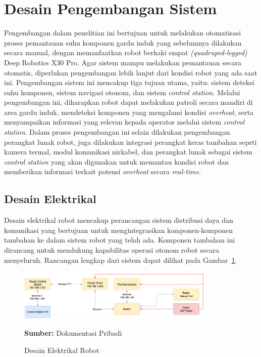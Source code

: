 \section{Desain Pengembangan Sistem}
Pengembangan dalam penelitian ini bertujuan untuk melakukan otomatisasi proses pemantauan suhu komponen gardu induk yang sebelumnya dilakukan secara manual, dengan memanfaatkan robot berkaki empat \emph{(quadruped-legged)} Deep Robotics X30 Pro. Agar sistem mampu melakukan pemantauan secara otomatis, diperlukan pengembangan lebih lanjut dari kondisi robot yang ada saat ini. Pengembangan sistem ini mencakup tiga tujuan utama, yaitu: sistem deteksi suhu komponen, sistem navigasi otonom, dan sistem \emph{control station}. Melalui pengembangan ini, diharapkan robot dapat melakukan patroli secara mandiri di area gardu induk, mendeteksi komponen yang mengalami kondisi \emph{overheat}, serta menyampaikan informasi yang relevan kepada operator melalui sistem \emph{control station}. Dalam proses pengembangan ini selain dilakukan pengembangan perangkat lunak robot, juga dilakukan integrasi perangkat keras tambahan seprti kamera termal, modul komunikasi nirkabel, dan perangkat lunak sebagai sistem \emph{control station} yang akan digunakan untuk memantau kondisi robot dan memberikan informasi terkait potensi \emph{overheat} secara \emph{real-time}.

\subsection{Desain Elektrikal}

Desain elektrikal robot mencakup perancangan sistem distribusi daya dan komunikasi yang bertujuan untuk mengintegrasikan komponen-komponen tambahan ke dalam sistem robot yang telah ada. Komponen tambahan ini dirancang untuk mendukung kapabilitas operasi otonom robot secara menyeluruh. Rancangan lengkap dari sistem dapat dilihat pada Gambar~\ref{fig:electrical}.

\begin{figure}[H]
  \centering
  \includegraphics[width=0.85\textwidth]{gambar/bab3/electrical-design.png}
  \caption{Desain Elektrikal Robot}
  \label{fig:electrical}
  \footnotesize{\textbf{Sumber:} Dokumentasi Pribadi}
\end{figure}

